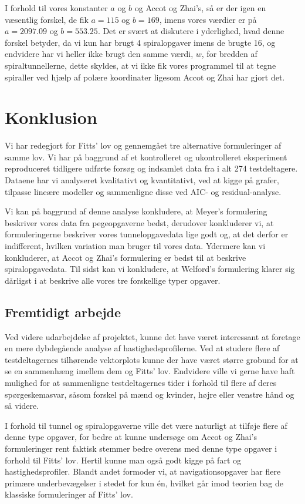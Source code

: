 I forhold til vores konstanter $a$ og $b$ og Accot og Zhai's, så er der igen en væsentlig forskel, de fik $a=115$ og $b=169$, imens vores værdier er på $a=2097.09$ og $b=553.25$. Det er svært at diskutere i yderlighed, hvad denne forskel betyder, da vi kun har brugt 4 spiralopgaver imens de brugte 16, og endvidere har vi heller ikke brugt den samme værdi, $w$, for bredden af spiraltunnellerne, dette skyldes, at vi ikke fik vores programmel til at tegne spiraller ved hjælp af polære koordinater ligesom Accot og Zhai har gjort det.

\chapter*{Konklusion}
Vi har redegjort for Fitts' lov og gennemgået tre alternative formuleringer af samme lov. Vi har på baggrund af et kontrolleret og ukontrolleret eksperiment reproduceret tidligere udførte forsøg og indsamlet data fra i alt 274 testdeltagere. Dataene har vi analyseret kvalitativt og kvantitativt, ved at kigge på grafer, tilpasse lineære modeller og sammenligne disse ved AIC- og residual-analyse. 

Vi kan på baggrund af denne analyse konkludere, at Meyer's formulering beskriver vores data fra pegeopgaverne bedst, derudover konkluderer vi, at formuleringerne beskriver vores tunnelopgavedata lige godt og, at det derfor er indifferent, hvilken variation man bruger til vores data. Ydermere kan vi konkluderer, at Accot og Zhai's formulering er bedst til at beskrive spiralopgavedata. Til sidst kan vi konkludere, at Welford's formulering klarer sig dårligst i at beskrive alle vores tre forskellige typer opgaver.

\section*{Fremtidigt arbejde}
Ved videre udarbejdelse af projektet, kunne det have været interessant at foretage en mere dybdegående analyse af hastighedsprofilerne. Ved at studere flere af testdeltagernes tilhørende vektorplots kunne der have været større grobund for at se en sammenhæng imellem dem og Fitts' lov. Endvidere ville vi gerne have haft mulighed for at sammenligne testdeltagernes tider i forhold til flere af deres spørgeskemasvar, såsom forskel på mænd og kvinder, højre eller venstre hånd og så videre.

I forhold til tunnel og spiralopgaverne ville det være naturligt at tilføje flere af denne type opgaver, for bedre at kunne undersøge om Accot og Zhai's formuleringer rent faktisk stemmer bedre overens med denne type opgaver i forhold til Fitts' lov. Hertil kunne man også godt kigge på fart og hastighedsprofiler. Blandt andet formoder vi, at navigationsopgaver har flere primære underbevægelser i stedet for kun én, hvilket går imod teorien bag de klassiske formuleringer af Fitts' lov.

